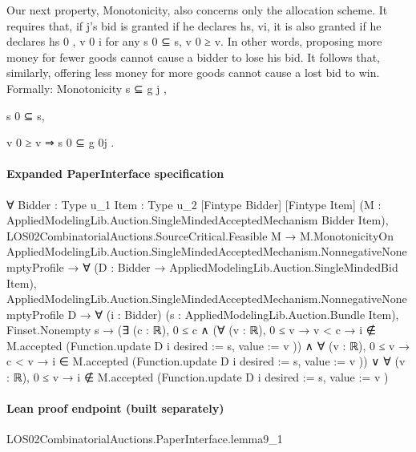 \documentclass[10pt]{article}
\begin{document}
\begin{ReviewVerbatim}

Our next property, Monotonicity, also concerns only the allocation scheme. It
requires that, if j’s bid is granted if he declares hs, vi, it is also granted if he
declares hs 0 , v 0 i for any s 0 ⊆ s, v 0 ≥ v. In other words, proposing more money for
fewer goods cannot cause a bidder to lose his bid. It follows that, similarly, offering
less money for more goods cannot cause a lost bid to win. Formally:
Monotonicity s ⊆ g j ,

s 0 ⊆ s,

v 0 ≥ v ⇒ s 0 ⊆ g 0j .
\end{ReviewVerbatim}



\paragraph{Expanded PaperInterface specification}
\begin{ReviewVerbatim}
∀ {Bidder : Type u_1} {Item : Type u_2} [Fintype Bidder] [Fintype Item]
  (M : AppliedModelingLib.Auction.SingleMindedAcceptedMechanism Bidder Item),
  LOS02CombinatorialAuctions.SourceCritical.Feasible M →
    M.MonotonicityOn AppliedModelingLib.Auction.SingleMindedAcceptedMechanism.NonnegativeNonemptyProfile →
      ∀ (D : Bidder → AppliedModelingLib.Auction.SingleMindedBid Item),
        AppliedModelingLib.Auction.SingleMindedAcceptedMechanism.NonnegativeNonemptyProfile D →
          ∀ (i : Bidder) (s : AppliedModelingLib.Auction.Bundle Item),
            Finset.Nonempty s →
              (∃ (c : ℝ),
                  0 ≤ c ∧
                    (∀ (v : ℝ), 0 ≤ v → v < c → i ∉ M.accepted (Function.update D i { desired := s, value := v })) ∧
                      ∀ (v : ℝ), 0 ≤ v → c < v → i ∈ M.accepted (Function.update D i { desired := s, value := v })) ∨
                ∀ (v : ℝ), 0 ≤ v → i ∉ M.accepted (Function.update D i { desired := s, value := v })
\end{ReviewVerbatim}



\paragraph{Lean proof endpoint (built separately)}\begin{ReviewVerbatim}
LOS02CombinatorialAuctions.PaperInterface.lemma9_1
\end{ReviewVerbatim}
\end{document}
